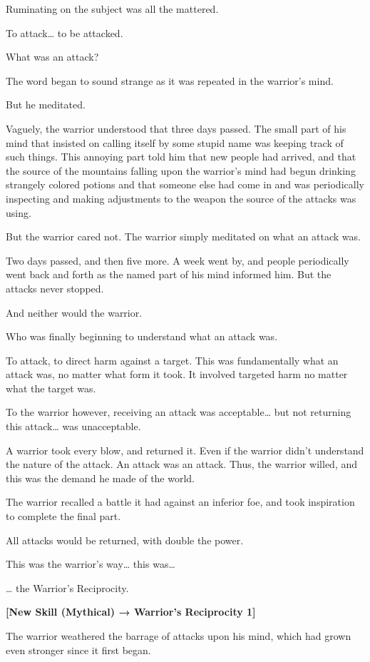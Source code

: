 \documentclass[a4paper,10pt]{book}
\begin{document}
Ruminating on the subject was all the mattered.\par
To attack… to be attacked.\par
What was an attack?\par
The word began to sound strange as it was repeated in the warrior’s mind.\par
But he meditated.\par
Vaguely, the warrior understood that three days passed. The small part of his mind that insisted on calling itself by some stupid name was keeping track of such things. This annoying part told him that new people had arrived, and that the source of the mountains falling upon the warrior’s mind had begun drinking strangely colored potions and that someone else had come in and was periodically inspecting and making adjustments to the weapon the source of the attacks was using.\par
But the warrior cared not. The warrior simply meditated on what an attack was.\par
Two days passed, and then five more. A week went by, and people periodically went back and forth as the named part of his mind informed him. But the attacks never stopped.\par
And neither would the warrior.\par
Who was finally beginning to understand what an attack was.\par
To attack, to direct harm against a target. This was fundamentally what an attack was, no matter what form it took. It involved targeted harm no matter what the target was.\par
To the warrior however, receiving an attack was acceptable… but not returning this attack… was unacceptable.\par
A warrior took every blow, and returned it. Even if the warrior didn’t understand the nature of the attack. An attack was an attack. Thus, the warrior willed, and this was the demand he made of the world.\par
The warrior recalled a battle it had against an inferior foe, and took inspiration to complete the final part.\par
All attacks would be returned, with double the power.\par
This was the warrior’s way… this was…\par
… the Warrior’s Reciprocity.\par
\textbf{[New Skill (Mythical) → Warrior’s Reciprocity 1]}\par
The warrior weathered the barrage of attacks upon his mind, which had grown even stronger since it first began.\par
\end{document}
